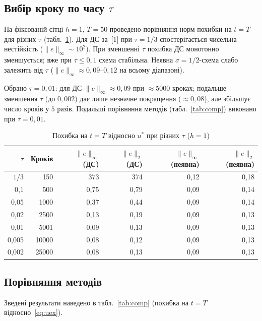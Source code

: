 \documentclass[14pt,a4paper,extarticle]{extarticle}
\newcommand{\uex}{u^*}
\begin{document}
\subsection{Вибір кроку по часу $\tau$}
\label{sec:tau}

На фіксованій сітці $h=1$, $T=50$ проведено порівняння норм похибки на $t=T$ для різних $\tau$ (табл.~\ref{tab:tau}). Для ДС за~[1] при $\tau=1/3$ спостерігається чисельна нестійкість ($\|e\|_\infty\sim 10^2$). При зменшенні $\tau$ похибка ДС монотонно зменшується; вже при $\tau\leq 0{,}1$ схема стабільна. Неявна $\sigma=1/2$-схема слабо залежить від $\tau$ ($\|e\|_\infty\approx 0{,}09$--$0{,}12$ на всьому діапазоні).

Обрано $\tau=0{,}01$: для ДС $\|e\|_\infty\approx 0{,}09$ при $\approx 5000$ кроках; подальше зменшення $\tau$ (до $0{,}002$) дає лише незначне покращення ($\approx 0{,}08$), але збільшує число кроків у $5$ разів. Подальші порівняння методів (табл.~\ref{tab:comp}) виконано при $\tau=0{,}01$.

\begin{table}[H]
  \caption{Похибка на $t=T$ відносно $\uex$ при різних $\tau$ ($h=1$)}
  \label{tab:tau}
  \centering
  \small
  \renewcommand{\arraystretch}{1.15}
  \begin{tabular}{|r|r|r|r|r|r|}
    \hline
    $\tau$ & Кроків & $\|e\|_\infty$ (ДС) & $\|e\|_2$ (ДС) & $\|e\|_\infty$ (неявна) & $\|e\|_2$ (неявна) \\
    \hline
    $1/3$ & 150 & 373 & 374 & 0,12 & 0,18 \\
    0,1 & 500 & 0,75 & 0,79 & 0,09 & 0,14 \\
    0,05 & 1000 & 0,37 & 0,44 & 0,09 & 0,14 \\
    0,02 & 2500 & 0,13 & 0,19 & 0,09 & 0,13 \\
    0,01 & 5001 & 0,09 & 0,13 & 0,09 & 0,13 \\
    0,005 & 10000 & 0,08 & 0,12 & 0,09 & 0,13 \\
    0,002 & 25000 & 0,08 & 0,13 & 0,09 & 0,13 \\
    \hline
  \end{tabular}
\end{table}

\subsection{Порівняння методів}

Зведені результати наведено в табл.~\ref{tab:comp} (похибка на $t=T$ відносно~\eqref{eq:uex}).
\end{document}
